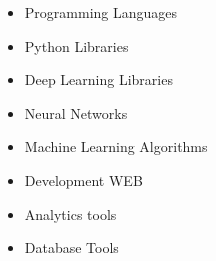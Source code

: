 

\begin{itemize}
\item \textcolor{emphasis}{Programming Languages} 
\end{itemize}


\divider\smallskip

\begin{itemize}
    \item \textcolor{emphasis}{Python Libraries}
    \end{itemize}
    \divider\smallskip
    
\begin{itemize}
    \item \textcolor{emphasis}{Deep Learning Libraries}
    \end{itemize}
    \divider\smallskip

\begin{itemize}
        \item \textcolor{emphasis}{Neural Networks}    
\end{itemize}
        \divider\smallskip

        \begin{itemize}
            \item \textcolor{emphasis}{Machine Learning Algorithms}    
    \end{itemize}
            \divider\smallskip
        \begin{itemize}
\item \textcolor{emphasis}{Development WEB}
\end{itemize}
\divider\smallskip

\begin{itemize}
\item \textcolor{emphasis}{Analytics tools}
\end{itemize}
\divider\smallskip



\begin{itemize}
    \item \textcolor{emphasis}{Database Tools}    
\end{itemize}
    \divider\smallskip

